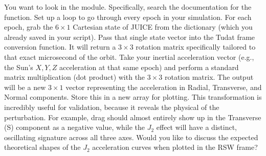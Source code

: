 {} You want to look in the  module. Specifically, search the documentation for the  function.\markdownRendererInterblockSeparator
{}\markdownRendererInterblockSeparator
{}\markdownRendererOlBegin
{} Set up a loop to go through every epoch in your simulation.\markdownRendererOlItemEnd 
{} For each epoch, grab the $6 \times 1$ Cartesian state of JUICE from the  dictionary (which you already saved in your script).\markdownRendererOlItemEnd 
{} Pass that single state vector into the Tudat frame conversion function. It will return a $3 \times 3$ rotation matrix specifically tailored to that exact microsecond of the orbit.\markdownRendererOlItemEnd 
{} Take your inertial acceleration vector (e.g., the Sun's $X, Y, Z$ acceleration at that same epoch) and perform a standard matrix multiplication (dot product) with the $3 \times 3$ rotation matrix.\markdownRendererOlItemEnd 
{} The output will be a new $3 \times 1$ vector representing the acceleration in Radial, Transverse, and Normal components. Store this in a new array for plotting.\markdownRendererOlItemEnd 
\markdownRendererOlEnd \markdownRendererInterblockSeparator
{}This transformation is incredibly useful for validation, because it reveals the physical  of the perturbation. For example, drag should almost entirely show up in the Transverse (S) component as a negative value, while the $J_2$ effect will have a distinct, oscillating signature across all three axes.\markdownRendererInterblockSeparator
{}Would you like to discuss the expected theoretical shapes of the $J_2$ acceleration curves when plotted in the RSW frame?\markdownRendererInterblockSeparator
{}\markdownRendererThematicBreak{}\markdownRendererInterblockSeparator
{}
\markdownRendererSectionEnd 
